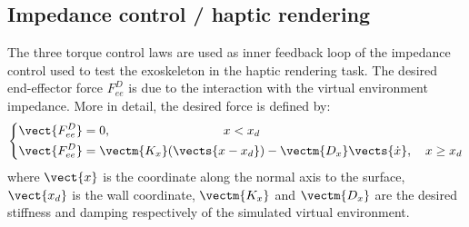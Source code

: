 \subsection{Impedance control / haptic rendering} \label{sub:impedanceCJICF}

The three torque control laws are used as inner feedback loop of the impedance control used to test the exoskeleton in the haptic rendering task. The desired end-effector force $F_{ee}^D$ is due to the interaction with the virtual environment impedance. More in detail, the desired force is defined by:
%
\begin{equation}
\label{eq:desiredVE}
\left \{
\begin{aligned}
& \vect{ F_{ee}^D} = 0, \ \ \ \quad \quad \quad \quad \quad \quad \quad \quad  x < x_d \\
& \vect{F_{ee}^D} = \vectm{K_x} (\vects{x - x_d}) - \vectm{D_x}\vects{\dot{x}}, \quad  x \geq x_d  \\
\end{aligned}
\right .
\end{equation}
%
%
%
where $\vect{x}$ is the coordinate along the normal axis to the surface, $\vect{x_d}$   is the wall coordinate, $\vectm{K_x}$ and $\vectm{D_x}$ are the desired stiffness and damping respectively of the simulated virtual environment.

